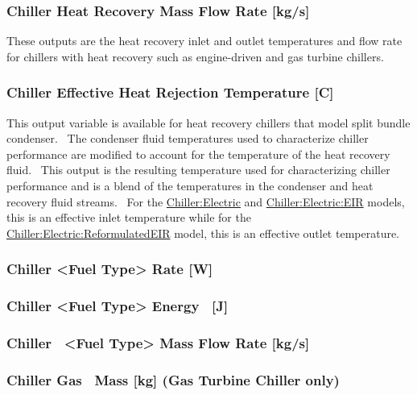 \subsubsection{Chiller Heat Recovery Mass Flow Rate {[}kg/s{]}}\label{chiller-heat-recovery-mass-flow-rate-kgs}

These outputs are the heat recovery inlet and outlet temperatures and flow rate for chillers with heat recovery such as engine-driven and gas turbine chillers.

\subsubsection{Chiller Effective Heat Rejection Temperature {[}C{]}}\label{chiller-effective-heat-rejection-temperature-c}

This output variable is available for heat recovery chillers that model split bundle condenser.~ The condenser fluid temperatures used to characterize chiller performance are modified to account for the temperature of the heat recovery fluid.~ This output is the resulting temperature used for characterizing chiller performance and is a blend of the temperatures in the condenser and heat recovery fluid streams.~ For the \hyperref[chillerelectric]{Chiller:Electric} and \hyperref[chillerelectriceir]{Chiller:Electric:EIR} models, this is an effective inlet temperature while for the \hyperref[chillerelectricreformulatedeir]{Chiller:Electric:ReformulatedEIR} model, this is an effective outlet temperature.

\subsubsection{Chiller \textless{}Fuel Type\textgreater{} Rate {[}W{]}}\label{chiller-fuel-type-rate-w}

\subsubsection{Chiller \textless{}Fuel Type\textgreater{} Energy~ {[}J{]}}\label{chiller-fuel-type-energy-j}

\subsubsection{Chiller~ \textless{}Fuel Type\textgreater{} Mass Flow Rate {[}kg/s{]}}\label{chiller-fuel-type-mass-flow-rate-kgs}

\subsubsection{Chiller Gas~ Mass {[}kg{]} (Gas Turbine Chiller only)}\label{chiller-gas-mass-kg-gas-turbine-chiller-only}

